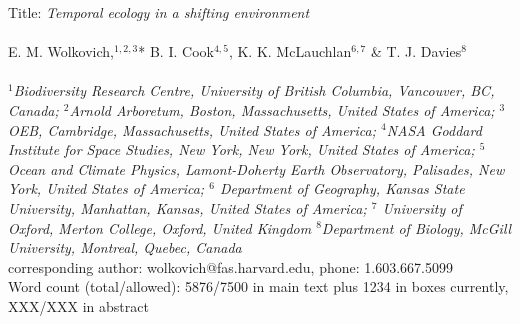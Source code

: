 \documentclass[11pt,a4paper,oneside]{article}
\begin{document}


\noindent Title: \emph{Temporal ecology in a shifting environment}\\
\\
\noindent E. M. Wolkovich,$^{1,2,3}$* B. I. Cook$^{4,5}$, K. K. McLauchlan$^{6,7}$ \& T. J. Davies$^{8}$\\
\\
\noindent \emph{$^{1}$Biodiversity Research Centre, University of British Columbia, Vancouver, BC, Canada; $^{2}$Arnold Arboretum, Boston, Massachusetts, United States of America; $^{3}$OEB, Cambridge, Massachusetts, United States of America; $^{4}$NASA Goddard Institute for Space Studies, New York, New York, United States of America; $^{5}$Ocean and Climate  Physics, Lamont-Doherty Earth Observatory, Palisades, New York, United States of America; $^{6}$ Department of Geography, Kansas State University, Manhattan, Kansas, United States of America; $^{7}$ University of Oxford, Merton College, Oxford, United Kingdom $^{8}$Department of Biology, McGill University, Montreal, Quebec, Canada}\\ %

\noindent *corresponding author: wolkovich@fas.harvard.edu, phone: 1.603.667.5099\\

\noindent Word count (total/allowed): 5876/7500 in main text plus 1234 in boxes currently, XXX/XXX in abstract %

\begin{abstract}
\end{abstract}
\end{document}
